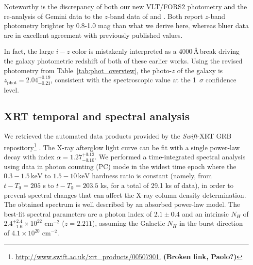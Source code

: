 \documentclass{aa}    %
\newcommand\todo[1]{\textbf{(#1)}}
\begin{document}
Noteworthy is the discrepancy of both our new VLT/FORS2 photometry and the
re-analysis of Gemini data to the $z$-band data of \citet{Margutti2012} and
\citet{Sakamoto2013}. Both report $z$-band photometry brighter by 0.8-1.0 mag
than what we derive here, whereas bluer data are in excellent agreement with
previously published values.

In fact, the large $i-z$ color is mistakenly interpreted as a 4000\,\AA\,break
driving the galaxy photometric redshift of both of these earlier works. Using
the revised photometry from Table~\ref{tab:phot_overview}, the photo-$z$ of the
galaxy is $z_{\mathrm{phot}}=2.04_{-0.21}^{+0.19}$, consistent with the
spectroscopic value at the 1~$\sigma$ confidence level.






\subsection{XRT temporal and spectral analysis}

We retrieved the automated data products provided by the \textit{Swift}-XRT GRB
repository\footnote{\url{http://www.swift.ac.uk/xrt\_products/00507901.}
	\todo{Broken link, Paolo?}} \citep{Evans2009}. The X-ray afterglow light curve
can be fit with a single power-law decay with index
$\alpha=1.27_{-0.10}^{+0.12}$. We performed a time-integrated spectral analysis
using data in photon counting (PC) mode in the widest time epoch where the
$0.3-1.5\,\mathrm{keV}$ to $1.5-10\,\mathrm{keV}$ hardness ratio is constant
(namely, from $t-T_0 = 205$ s to $t-T_0 = 203.5$ ks, for a total of 29.1 ks of
data), in order to prevent spectral changes that can affect the X-ray column
density determination. The obtained spectrum is well described by an absorbed
power-law model. The best-fit spectral parameters are a photon index of $2.1 \pm
0.4$ and an intrinsic $N_{H}$ of $2.4_{-1.6}^{+2.4} \times 10^{22}$ cm$^{-2}$
($z=2.211$), assuming the Galactic $N_{H}$ in the burst direction of $4.1 \times
10^{20}$ cm$^{-2}$.
\end{document}
